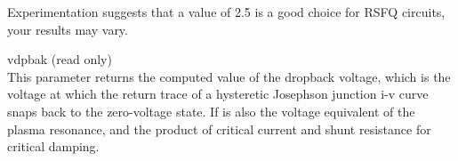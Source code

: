 \begin{description}
Experimentation suggests that a value of 2.5 is a good choice for RSFQ
circuits, your results may vary.

\item{\vt vdpbak} (read only)\\
This parameter returns the computed value of the dropback voltage,
which is the voltage at which the return trace of a hysteretic
Josephson junction i-v curve snaps back to the zero-voltage state.  If
is also the voltage equivalent of the plasma resonance, and the
product of critical current and shunt resistance for critical damping.
\end{description}


